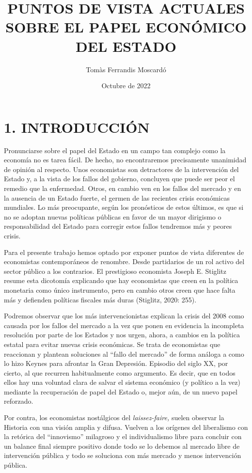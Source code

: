 \documentclass[
]{article}
\title{PUNTOS DE VISTA ACTUALES SOBRE EL PAPEL ECONÓMICO DEL ESTADO}
\author{Tomàs Ferrandis Moscardó}
\date{Octubre de 2022}
\begin{document}
\maketitle

{
\setcounter{tocdepth}{2}
\tableofcontents
}
\hypertarget{introducciuxf3n}{%
\section{1. INTRODUCCIÓN}\label{introducciuxf3n}}

Pronunciarse sobre el papel del Estado en un campo tan complejo como la
economía no es tarea fácil. De hecho, no encontraremos precisamente
unanimidad de opinión al respecto. Unos economistas son detractores de
la intervención del Estado y, a la vista de los fallos del gobierno,
concluyen que puede ser peor el remedio que la enfermedad. Otros, en
cambio ven en los fallos del mercado y en la ausencia de un Estado
fuerte, el germen de las recientes crisis económicas mundiales. Lo más
preocupante, según los pronósticos de estos últimos, es que si no se
adoptan nuevas políticas públicas en favor de un mayor dirigismo o
responsabilidad del Estado para corregir estos fallos tendremos más y
peores crisis.

Para el presente trabajo hemos optado por exponer puntos de vista
diferentes de economistas contemporáneos de renombre. Desde partidarios
de un rol activo del sector público a los contrarios. El prestigioso
economista Joseph E. Stiglitz resume esta dicotomía explicando que hay
economistas que creen en la política monetaria como único instrumento,
pero en cambio otros creen que hace falta más y defienden políticas
fiscales más duras (Stiglitz, 2020: 255).

Podremos observar que los más intervencionistas explican la crisis del
2008 como causada por los fallos del mercado a la vez que ponen en
evidencia la incompleta resolución por parte de los Estados y nos urgen,
ahora, a cambios en la política estatal para evitar nuevas crisis
económicas. Se trata de economistas que reaccionan y plantean soluciones
al ``fallo del mercado'' de forma análoga a como lo hizo Keynes para
afrontar la Gran Depresión. Episodio del siglo XX, por cierto, al que
recurren habitualmente como argumento. Es decir, que en todos ellos hay
una voluntad clara de salvar el sistema económico (y político a la vez)
mediante la recuperación de papel del Estado o, mejor aún, de un nuevo
papel reforzado.

Por contra, los economistas nostálgicos del \emph{laissez-faire,} suelen
observar la Historia con una visión amplia y difusa. Vuelven a los
orígenes del liberalismo con la retórica del ``innovismo'' milagroso y
el individualismo libre para concluir con un balance final siempre
positivo donde todo se lo debemos al mercado libre de intervención
pública y todo se soluciona con más mercado y menos intervención
pública.
\end{document}
